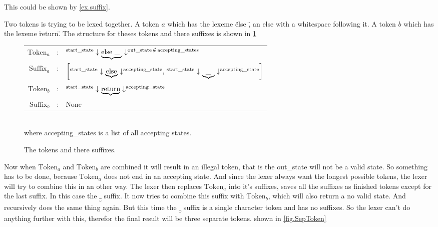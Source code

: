 This could be shown by \cref{ex.suffix}.
\begin{example}
\label{ex.suffix}
Two tokens is trying to be lexed together. A token $a$ which has the lexeme \"else \", an else with a whitespace following it. A token $b$ which has the lexeme \"return\". The structure for theses tokens and there suffixes is shown in \cref{fig.TokenSuffix}

\begin{figure}[!h]
  \centering
  \begin{tabular}{r c l}
    $\text{Token}_a$ & : & $\textsuperscript{start\_state} \downarrow
      \underbrace{ \text{else \_ }} \downarrow ^{\text{out\_state} \, \notin 
      \, \text{accepting\_states} }$\\
    $\text{Suffix}_a$ & : & $\left[ \textsuperscript{start\_state} \downarrow
      \underbrace{ \text{else}} \downarrow ^{\text{accepting\_state} } , \, 
      \textsuperscript{start\_state} \downarrow \underbrace{ \text{\_}}
      \downarrow ^{\text{accepting\_state} } \right]$\\
    $\text{Token}_b$ & : & $\textsuperscript{start\_state} \downarrow
      \underbrace{ \text{return}} \downarrow ^{\text{accepting\_state}}$\\
    $\text{Suffix}_b$ & : & None
  \end{tabular}\\
  where accepting\_states is a list of all accepting states.
  \caption{The tokens and there suffixes.
    \label{fig.TokenSuffix}}
\end{figure}
Now when $\text{Token}_a$ and $\text{Token}_b$ are combined it will result in an illegal token, that is the out\_state will not be a valid state. So something has to be done, because $\text{Token}_a$ does not end in an accepting state. And since the lexer always want the longest possible tokens, the lexer will try to combine this in an other way. The lexer then replaces $\text{Token}_a$ into it's suffixes, saves all the suffixes as finished tokens except for the last suffix. In this case the $\underbrace{ \text{\_}}$ suffix. It now tries to combine this suffix with $\text{Token}_b$, which will also return a no valid state. And recursively does the same thing again. But this time the $\underbrace{ \text{\_}}$ suffix is a single character token and has no suffixes. So the lexer can't do anything further with this, therefor the final result will be three separate tokens. shown in \cref{fig.SepToken}


\end{example}
